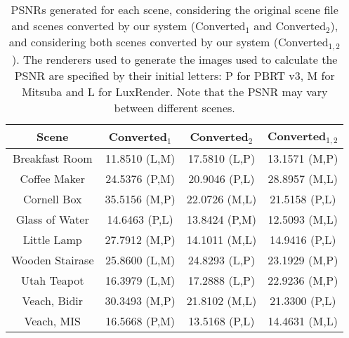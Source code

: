 \scriptsize
\begin{table}
\begin{center}
    \begin{tabular}{ | c | c | c | c | }
    \hline
    {\bf Scene} & {\bf Converted$_1$} & {\bf Converted$_2$} & {\bf Converted$_{1,2}$} \\ 
    \hline
    Breakfast Room & 11.8510 \small{(L,M)} & 17.5810 \small{(L,P)} & 13.1571 \small{(M,P)} \\
    Coffee Maker & 24.5376 \small{(P,M)} & 20.9046 \small{(P,L)} & 28.8957 \small{(M,L)} \\
    Cornell Box & 35.5156 \small{(M,P)} & 22.0726 \small{(M,L)} & 21.5158 \small{(P,L)} \\
  	Glass of Water & 14.6463 \small{(P,L)} & 13.8424 \small{(P,M)} & 12.5093 \small{(M,L)} \\
  	Little Lamp & 27.7912 \small{(M,P)} & 14.1011 \small{(M,L)} & 14.9416 \small{(P,L)} \\
  	Wooden Stairase & 25.8600 \small{(L,M)} & 24.8293 \small{(L,P)} & 23.1929 \small{(M,P)} \\
  	Utah Teapot & 16.3979 \small{(L,M)} & 17.2888 \small{(L,P)} & 22.9236 \small{(M,P)} \\
	Veach, Bidir & 30.3493 \small{(M,P)} & 21.8102 \small{(M,L)} & 21.3300 \small{(P,L)} \\
	Veach, MIS & 16.5668 \small{(P,M)} & 13.5168 \small{(P,L)} & 14.4631 \small{(M,L)} \\
	\hline

    \end{tabular}
\end{center}
  \caption{PSNRs generated for each scene, considering the original scene file and scenes converted by our system (Converted$_1$ and Converted$_2$), and considering both scenes converted by our system (Converted$_{1,2}$). The renderers used to generate the images used to calculate the PSNR are specified by their initial letters: P for PBRT v3, M for Mitsuba and L for LuxRender. Note that the PSNR may vary between different scenes. } 
  \label{tab:summary}
\end{table}
\normalsize 